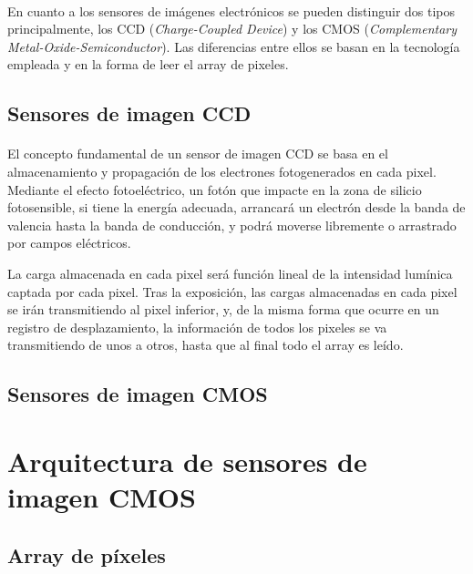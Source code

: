 \paragraph{}
En cuanto a los sensores de imágenes electrónicos se pueden distinguir dos tipos
principalmente, los CCD (\textit{Charge-Coupled Device}) y los CMOS
(\textit{Complementary Metal-Oxide-Semiconductor}). Las diferencias entre ellos
se basan en la tecnología empleada y en la forma de leer el array de pixeles.

\subsection{Sensores de imagen CCD}

\paragraph{}
El concepto fundamental de un sensor de imagen CCD se basa en el almacenamiento
y propagación de los electrones fotogenerados en cada pixel. Mediante el efecto
fotoeléctrico, un fotón que impacte en la zona de silicio fotosensible, si tiene
la energía adecuada, arrancará un electrón desde la banda de valencia hasta la
banda de conducción, y podrá moverse libremente o arrastrado por campos eléctricos.

La carga almacenada en cada pixel será función lineal de la intensidad lumínica
captada por cada pixel. Tras la exposición, las cargas almacenadas en cada pixel
se irán transmitiendo al pixel inferior, y, de la misma forma que ocurre en un
registro de desplazamiento, la información de todos los pixeles se va transmitiendo
de unos a otros, hasta que al final todo el array es leído.

\subsection{Sensores de imagen CMOS}

\paragraph{}


\section{Arquitectura de sensores de imagen CMOS}

\subsection{Array de píxeles}

